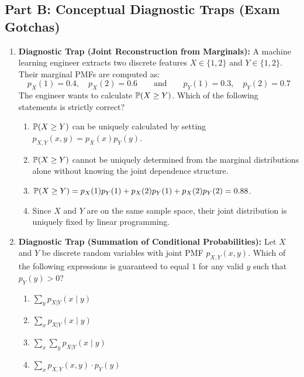\subsection*{Part B: Conceptual Diagnostic Traps (Exam Gotchas)}

\begin{enumerate}[resume]
\item \textbf{Diagnostic Trap (Joint Reconstruction from Marginals):}
A machine learning engineer extracts two discrete features $X \in \{1, 2\}$ and $Y \in \{1, 2\}$. Their marginal PMFs are computed as:
$$p_X(1) = 0.4, \quad p_X(2) = 0.6 \qquad \text{and} \qquad p_Y(1) = 0.3, \quad p_Y(2) = 0.7$$
The engineer wants to calculate $\P(X \ge Y)$. Which of the following statements is strictly correct?
\begin{enumerate}
    \item $\P(X \ge Y)$ can be uniquely calculated by setting $p_{X,Y}(x, y) = p_X(x) p_Y(y)$.
    \item $\P(X \ge Y)$ cannot be uniquely determined from the marginal distributions alone without knowing the joint dependence structure.
    \item $\P(X \ge Y) = p_X(1)p_Y(1) + p_X(2)p_Y(1) + p_X(2)p_Y(2) = 0.88$.
    \item Since $X$ and $Y$ are on the same sample space, their joint distribution is uniquely fixed by linear programming.
\end{enumerate}

\item \textbf{Diagnostic Trap (Summation of Conditional Probabilities):}
Let $X$ and $Y$ be discrete random variables with joint PMF $p_{X,Y}(x, y)$. Which of the following expressions is guaranteed to equal $1$ for any valid $y$ such that $p_Y(y) > 0$?
\begin{enumerate}
    \item $\sum_{y} p_{X|Y}(x \mid y)$
    \item $\sum_{x} p_{X|Y}(x \mid y)$
    \item $\sum_{x} \sum_{y} p_{X|Y}(x \mid y)$
    \item $\sum_{x} p_{X,Y}(x, y) \cdot p_Y(y)$
\end{enumerate}
\end{enumerate}
